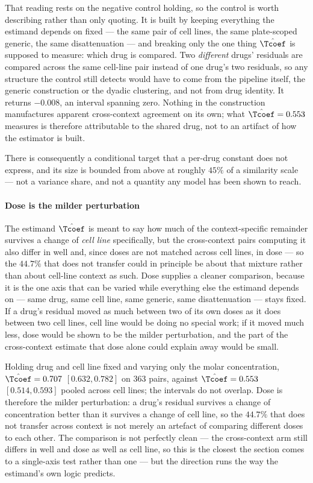 That reading rests on the negative control holding, so the control is worth
describing rather than only quoting. It is built by keeping everything the
estimand depends on fixed --- the same pair of cell lines, the same plate-scoped
generic, the same disattenuation --- and breaking only the one thing $\hat{\Tcoef}$
is supposed to measure: which drug is compared. Two \emph{different} drugs' residuals
are compared across the same cell-line pair instead of one drug's two residuals,
so any structure the control still detects would have to come from the pipeline
itself, the generic construction or the dyadic clustering, and not from drug
identity. It returns $-0.008$, an interval spanning zero. Nothing in the
construction manufactures apparent cross-context agreement on its own; what
$\hat{\Tcoef} = 0.553$ measures is therefore attributable to the shared drug, not
to an artifact of how the estimator is built.

There is consequently a conditional target that a per-drug constant does not
express, and its size is bounded from above at roughly $45\%$ of a similarity
scale --- not a variance share, and not a quantity any model has been shown to
reach.

\paragraph{Dose is the milder perturbation} The estimand $\hat{\Tcoef}$ is meant
to say how much of the context-specific remainder survives a change of
\emph{cell line} specifically, but the cross-context pairs computing it also
differ in well and, since doses are not matched across cell lines, in dose ---
so the $44.7\%$ that does not transfer could in principle be about that mixture
rather than about cell-line context as such. Dose supplies a cleaner comparison,
because it is the one axis that can be varied while everything else the
estimand depends on --- same drug, same cell line, same generic, same
disattenuation --- stays fixed. If a drug's residual moved as much between two
of its own doses as it does between two cell lines, cell line would be doing no
special work; if it moved much less, dose would be shown to be the milder
perturbation, and the part of the cross-context estimate that dose alone could
explain away would be small.

Holding drug and cell line fixed and varying only the molar concentration,
$\hat{\Tcoef} = 0.707$ $[0.632, 0.782]$ on $\num{363}$ pairs, against
$\hat{\Tcoef} = 0.553$ $[0.514, 0.593]$ pooled across cell lines; the intervals
do not overlap. Dose is therefore the milder perturbation: a drug's residual
survives a change of concentration better than it survives a change of cell
line, so the $44.7\%$ that does not transfer across context is not merely an
artefact of comparing different doses to each other. The comparison is not
perfectly clean --- the cross-context arm still differs in well and dose as well
as cell line, so this is the closest the section comes to a single-axis test
rather than one --- but the direction runs the way the estimand's own logic
predicts.


